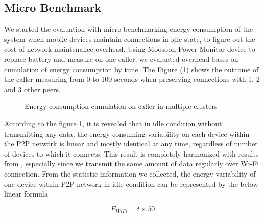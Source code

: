 \documentclass[conference]{IEEEtran}
\begin{document}
\subsection{Micro Benchmark}
We started the evaluation with micro benchmarking energy consumption of the system when mobile devices maintain connections in idle state, to figure out the cost of network maintenance overhead. Using Moosoon Power Monitor device \cite{moosoon} to replace battery and measure on one caller, we evaluated overhead bases on cumulation of energy consumption by time. The Figure (\ref{fig:microb_24}) shows the outcome of the caller measuring from 0 to 100 seconds when preserving connections with 1, 2 and 3 other peers. 

\begin{figure}
	\hspace*{-0.15cm}
	\caption{Energy consumption cumulation on caller in multiple clusters}
	\label{fig:microb_24}
\end{figure}

According to the figure \ref{fig:microb_24}, it is revealed that in idle condition without transmitting any data, the energy consuming variability on each device within the P2P network is linear and mostly identical at any time, regardless of number of devices to which it connects. This result is completely harmonized with results from \cite{wifi_energy}, especially since we transmit the same amount of data regularly over Wi-Fi connection. From the statistic information we collected, the energy variability of one device within P2P network in idle condition can be represented by the below linear formula

\begin{equation}
\label{eq:wifi_overload}
E_{WiFi} = t \times 50
\end{equation}
\end{document}
